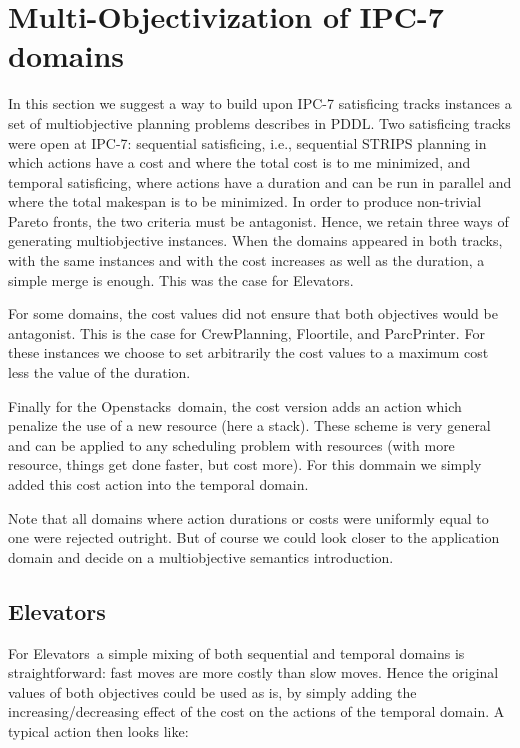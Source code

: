 \documentclass[letterpaper]{article}
\newcommand{\OPENSTACKS}{{\sc Openstacks}}
\newcommand{\ELEVATORS}{{\sc Elevators}}
\newcommand{\CREWPLANNING}{{\sc CrewPlanning}}
\newcommand{\FLOORTILE}{{\sc Floortile}}
\newcommand{\PARCPRINTER}{{\sc ParcPrinter}}
\begin{document}
\section{Multi-Objectivization of IPC-7 domains}
\label{testbench}
In this section we suggest a way to build upon IPC-7 satisficing tracks instances a set of multiobjective planning problems describes in PDDL.
Two satisficing tracks were open at IPC-7: sequential satisficing, i.e., sequential STRIPS planning in which actions have a cost and where the total cost is to me minimized, and temporal satisficing, where actions have a duration and can be run in parallel and where the total makespan is to be minimized.
In order to produce non-trivial Pareto fronts, the two criteria must be antagonist. 
Hence, we retain three ways of generating multiobjective instances. When the domains appeared in both tracks, with the same instances and with the cost increases as well as the duration, a simple merge is enough. This was the case for \ELEVATORS.

For some domains, the cost values did not ensure that both objectives would be antagonist. This is the case for \CREWPLANNING, \FLOORTILE, and \PARCPRINTER.
For these instances we choose to set arbitrarily the cost values to a maximum cost less the value of the duration.

Finally for the \OPENSTACKS\ domain, the cost version adds an action which penalize the use of a new resource (here a stack). These scheme is very general and can be applied to any scheduling problem with resources (with more resource, things get done faster, but cost more). For this dommain we simply added this cost action into the temporal domain.

Note that all domains where action durations or costs were uniformly equal to one were rejected outright. But of course we could look closer to the application domain and decide on a multiobjective semantics introduction.

\subsection{\ELEVATORS}

For \ELEVATORS\ a simple mixing of both sequential and temporal domains is straightforward: fast moves are more costly than slow moves. Hence the original values of both objectives could be used as is, by simply adding the increasing/decreasing effect of the cost on the actions of the temporal domain. A typical action then looks like:
\end{document}
